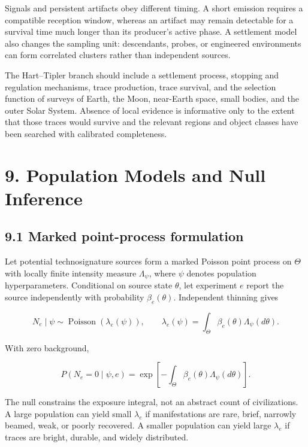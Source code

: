 \documentclass[11pt,a4paper]{article}
\begin{document}
Signals and persistent artifacts obey different timing. A short emission requires a compatible reception window, whereas an artifact may remain detectable for a survival time much longer than its producer's active phase. A settlement model also changes the sampling unit: descendants, probes, or engineered environments can form correlated clusters rather than independent sources.

The Hart--Tipler branch should include a settlement process, stopping and regulation mechanisms, trace production, trace survival, and the selection function of surveys of Earth, the Moon, near-Earth space, small bodies, and the outer Solar System. Absence of local evidence is informative only to the extent that those traces would survive and the relevant regions and object classes have been searched with calibrated completeness.

\section{9. Population Models and Null Inference}\label{9-population-models-and-null-inference}

\subsection{9.1 Marked point-process formulation}\label{91-marked-point-process-formulation}

Let potential technosignature sources form a marked Poisson point process on \(\Theta\) with locally finite intensity measure \(\Lambda_\psi\), where \(\psi\) denotes population hyperparameters. Conditional on source state \(\theta\), let experiment \(e\) report the source independently with probability \(\beta_e(\theta)\). Independent thinning gives

\begin{equation}
N_e\mid\psi\sim\operatorname{Poisson}(\lambda_e(\psi)),
\qquad
\lambda_e(\psi)=\int_\Theta\beta_e(\theta)\Lambda_\psi(d\theta).
\end{equation}

With zero background,

\begin{equation}
P(N_e=0\mid\psi,e)=
\exp\!\left[-\int_\Theta\beta_e(\theta)\Lambda_\psi(d\theta)\right].
\end{equation}

The null constrains the exposure integral, not an abstract count of civilizations. A large population can yield small \(\lambda_e\) if manifestations are rare, brief, narrowly beamed, weak, or poorly recovered. A smaller population can yield large \(\lambda_e\) if traces are bright, durable, and widely distributed.
\end{document}
